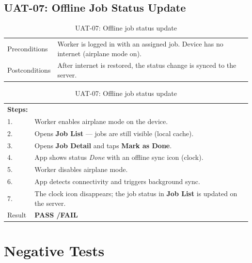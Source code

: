 \subsection*{UAT-07: Offline Job Status Update}
\begin{table}[H]
  \centering
  \begin{tabularx}{\textwidth}{lX}
    \toprule
    Preconditions  & Worker is logged in with an assigned job. Device has no internet (airplane mode on). \\
    Postconditions & After internet is restored, the status change is synced to the server. \\
    \midrule
  \end{tabularx}
  \begin{tabularx}{\textwidth}{lX}
    \textbf{Steps:} & \\
    1. & Worker enables airplane mode on the device. \\
    2. & Opens \textbf{Job List} --- jobs are still visible (local cache). \\
    3. & Opens \textbf{Job Detail} and taps \textbf{Mark as Done}. \\
    4. & App shows status \textit{Done} with an offline sync icon (clock). \\
    5. & Worker disables airplane mode. \\
    6. & App detects connectivity and triggers background sync. \\
    7. & The clock icon disappears; the job status in \textbf{Job List} is updated on the server. \\
    \midrule
    Result & \textbf{PASS \quad/\quad FAIL} \\
    \bottomrule
  \end{tabularx}
  \caption{UAT-07: Offline job status update}
\end{table}

\section{Negative Tests}

